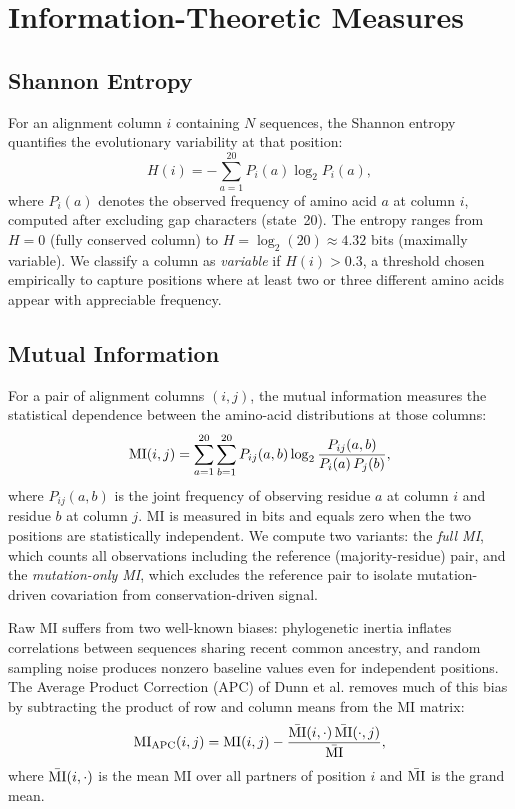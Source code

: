 \section{Information-Theoretic Measures}
\label{sec:theory-info}

\subsection{Shannon Entropy}
\label{sec:shannon}

For an alignment column $i$ containing $N$ sequences, the Shannon entropy
\cite{shannon1948} quantifies the evolutionary variability at that position:
\begin{equation}
	H(i) = -\sum_{a=1}^{20} P_i(a) \log_2 P_i(a),
	\label{eq:shannon}
\end{equation}
where $P_i(a)$ denotes the observed frequency of amino acid $a$ at column $i$,
computed after excluding gap characters (state~20).  The entropy ranges from
$H = 0$ (fully conserved column) to $H = \log_2(20) \approx 4.32$ bits
(maximally variable).  We classify a column as \emph{variable} if $H(i)
	> 0.3$, a threshold chosen empirically to capture positions where at least two
or three different amino acids appear with appreciable frequency.

\subsection{Mutual Information}
\label{sec:mutual-info}

For a pair of alignment columns $(i, j)$, the mutual information measures the
statistical dependence between the amino-acid distributions at those columns:
\begin{equation}
	\mathrm{MI}(i,j) = \sum_{a=1}^{20}\sum_{b=1}^{20} P_{ij}(a,b)
	\log_2 \frac{P_{ij}(a,b)}{P_i(a)\,P_j(b)},
	\label{eq:mi}
\end{equation}
where $P_{ij}(a,b)$ is the joint frequency of observing residue $a$ at column
$i$ and residue $b$ at column $j$.  MI is measured in bits and equals zero
when the two positions are statistically independent.  We compute two variants:
the \emph{full MI}, which counts all observations including the reference
(majority-residue) pair, and the \emph{mutation-only MI}, which excludes the
reference pair to isolate mutation-driven covariation from conservation-driven
signal.

Raw MI suffers from two well-known biases: phylogenetic inertia inflates
correlations between sequences sharing recent common ancestry, and random
sampling noise produces nonzero baseline values even for independent
positions.  The Average Product Correction (APC) of Dunn et
al.\cite{dunn2008} removes much of this bias by subtracting the product of row
and column means from the MI matrix:
\begin{equation}
	\mathrm{MI}_{\mathrm{APC}}(i,j) =
	\mathrm{MI}(i,j) - \frac{\bar{\mathrm{MI}}(i,\cdot)\,\bar{\mathrm{MI}}(\cdot,j)}{\bar{\mathrm{MI}}},
	\label{eq:apc}
\end{equation}
where $\bar{\mathrm{MI}}(i,\cdot)$ is the mean MI over all partners of position $i$
and $\bar{\mathrm{MI}}$ is the grand mean.

